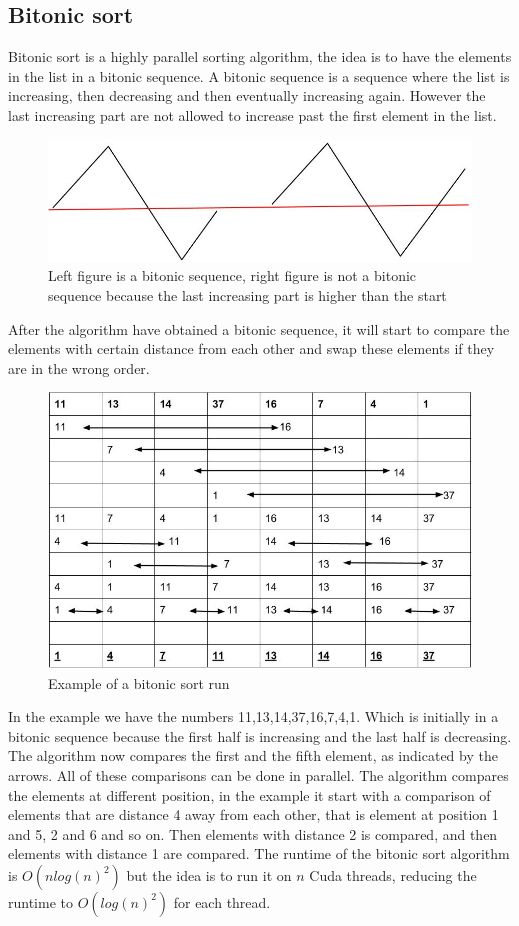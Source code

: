 \subsection{Bitonic sort}
Bitonic sort is a highly parallel sorting algorithm, the idea is to have the elements in the list in a bitonic sequence. A bitonic sequence is a sequence where the list is increasing, then decreasing and then eventually increasing again. However the last increasing part are not allowed to increase past the first element in the list.
\begin{figure}[H]
    \centering
    \includegraphics[width=0.8\linewidth]{images/bitonicseq}
    \caption[Sequence of elements]{Left figure is a bitonic sequence, right figure is not a bitonic sequence because the last increasing part is higher than the start}\label{fig:bitonicseq}
\end{figure}
After the algorithm have obtained a bitonic sequence, it will start to compare the elements with certain distance from each other and swap these elements if they are in the wrong order.
\begin{figure}[H]
    \centering
    \includegraphics[width=0.8\linewidth]{images/bitonicexample}
    \caption{Example of a bitonic sort run}\label{fig:bitonicex}
\end{figure}
In the example we have the numbers 11,13,14,37,16,7,4,1. Which is initially in a bitonic sequence because the first half is increasing and the last half is decreasing. The algorithm now compares the first and the fifth element, as indicated by the arrows. All of these comparisons can be done in parallel. The algorithm compares the elements at different position, in the example it start with a comparison of elements that are distance 4 away from each other, that is element at position 1 and 5, 2 and 6 and so on. Then elements with distance 2 is compared, and then elements with distance 1 are compared.
The runtime of the bitonic sort algorithm is $O(nlog(n)^2)$ but the idea is to run it on $n$ Cuda threads, reducing the runtime to $O(log(n)^2)$ for each thread.
